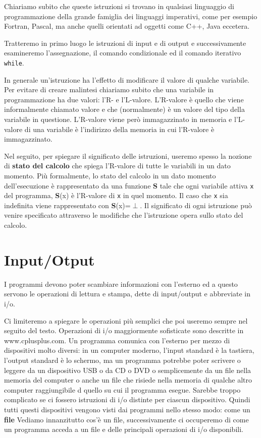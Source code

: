 \documentclass[a4paper,12pt]{book}
\begin{document}
\noindent Chiariamo subito che queste istruzioni si trovano in qualsiasi linguaggio di programmazione della grande famiglia dei linguaggi imperativi, come per esempio Fortran, Pascal, ma anche quelli orientati ad oggetti come C++, Java eccetera.

\noindent Tratteremo in primo luogo le istruzioni di input e di output e successivamente esamineremo l'assegnazione, il comando condizionale ed il comando iterativo \texttt{while}.

In generale un'istruzione ha l'effetto di modificare il valore di qualche variabile.
Per evitare di creare malintesi chiariamo subito che una variabile in programmazione ha due valori: l'R- e l'L-valore.
L'R-valore è quello che viene informalmente chiamato valore e che (normalmente) è un valore del tipo della variabile in questione.
L'R-valore viene però immagazzinato in memoria e l'L-valore di una variabile è l'indirizzo della memoria in cui l'R-valore è immagazzinato.

Nel seguito, per spiegare il significato delle istruzioni, useremo spesso la nozione di \textbf{stato del calcolo} che spiega l'R-valore di tutte le variabili in un dato momento.
Più formalmente, lo stato del calcolo in un dato momento dell'esecuzione è rappresentato da una funzione \textbf{S} tale che ogni variabile attiva \texttt{x} del programma, \textbf{S}(x) è l'R-valore di \texttt{x} in quel momento.
Il caso che \texttt{x} sia indefinita viene rappresentato con \textbf{S}(x)=$\perp$.
Il significato di ogni istruzione può venire specificato attraverso le modifiche che l'istruzione opera sullo stato del calcolo.

\section{Input/Otput}
I programmi devono poter scambiare informazioni con l'esterno ed a questo servono le operazioni di lettura e stampa, dette di input/output e abbreviate in i/o.

\noindent Ci limiteremo a spiegare le operazioni più semplici che poi useremo sempre nel seguito del testo.
Operazioni di i/o maggiormente sofisticate sono descritte in www.cplusplus.com.
Un programma comunica con l'esterno per mezzo di dispositivi molto diversi: in un computer moderno, l'input standard è la tastiera, l'output standard è lo schermo, ma un programma potrebbe poter scrivere o leggere da un dispositivo USB o da CD o DVD o semplicemente da un file nella memoria del computer o anche un file che risiede nella memoria di qualche altro computer raggiungibile d quello su cui il programma esegue.
Sarebbe troppo complicato se ci fossero istruzioni di i/o distinte per ciascun dispositivo.
Quindi tutti questi dispositivi vengono visti dai programmi nello stesso modo: come un \textbf{file}
Vediamo innanzitutto cos'è un file, successivamente ci occuperemo di come un programma acceda a un file e delle principali operazioni di i/o disponibili.
\end{document}
